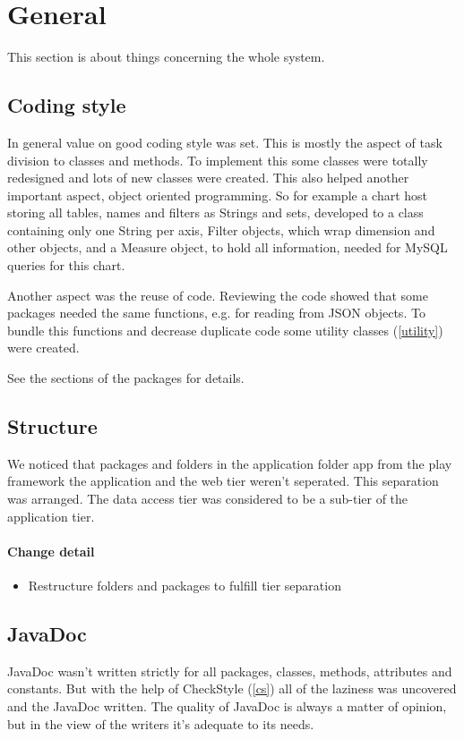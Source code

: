 \section{General}
This section is about things concerning the whole system.

\subsection{Coding style}
In general value on good coding style was set. This is mostly the aspect
of task division to classes and methods. To implement this some classes were totally redesigned
and lots of new classes were created. This also helped another important aspect, object oriented programming.
So for example a chart host storing all tables, names and filters as Strings and sets, developed to
a class containing only one String per axis, Filter objects, which wrap dimension and other objects, and a Measure
object, to hold all information, needed for MySQL queries for this chart.

Another aspect was the reuse of code. Reviewing the code showed that some packages needed the same
functions, e.g. for reading from JSON objects. To bundle this functions and
decrease duplicate code some utility classes (\ref{utility}) were created.

See the sections of the packages for details.

\subsection{Structure}
We noticed that packages and folders in the application folder app from the play framework 
the application and the web tier weren't seperated. This separation was arranged. 
The data access tier was considered to be a sub-tier of the application tier. 

\paragraph{Change detail}
\begin{itemize}
  \item Restructure folders and packages to fulfill tier separation
\end{itemize}

\subsection{JavaDoc} %
JavaDoc wasn't written strictly for all packages, classes, methods, attributes and constants. 
But with the help of CheckStyle (\ref{cs}) all of the laziness was uncovered and the JavaDoc written.
The quality of JavaDoc is always a matter of opinion, but in the view of the
writers it's adequate to its needs.

